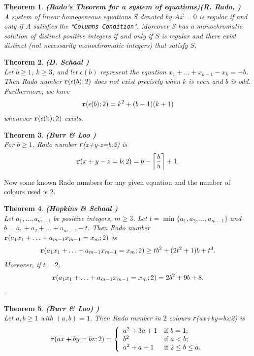 \documentclass[12pt]{report}
\def\ora{\overrightarrow}
\newtheorem{thm}{Theorem}[chapter]
\begin{document}
\begin{thm}{\bf (Rado's Theorem for a system of equations)}{\bf (R. Rado, \cite{Rado1,Rado2,Rado3})} \\[5pt]
A system of linear homogeneous equations $S$ denoted by $A \ora{x}=0$ is regular if and only if $A$ satisfies the ``{\tt \/Columns Condition}". Moreover $S$ has a monochromatic solution of distinct positive integers if and only if $S$ is regular and there exist distinct (not necessarily monochromatic integers) that satisfy $S$.
\end{thm}

\begin{thm}{\bf  (D. Schaal \cite{DS})} \\[5pt]
Let $b \geq 1$, $k \geq 3$, and let $\epsilon(b)$ represent the equation $x_1+\ldots+x_{k-1}-x_k=-b$. Then Rado number ${\tt{r}}(\epsilon(b);2)$ does not exist precisely when $k$ is even and $b$ is odd. Furthermore, we have
\[{\tt{r}}(\epsilon(b);2) = k^2+(b-1)(k+1) \]
whenever $\tt{r}(\epsilon(b);2)$ exists.
\end{thm}

\begin{thm}{\bf (Burr \& Loo {\cite{BL}})} \\[5pt]
For $b \geq 1$, Rado number {\tt{r}}(x+y-z=b;2) is 
\[ {\tt{r}}(x+y-z=b;2) = b - \left\lceil \frac{b}{5} \right\rceil + 1. \]
\end{thm}

\noindent Now some known Rado numbers for any given equation and the number of colours used is $2$. 

\begin{thm}{\bf (Hopkins \& Schaal {\cite{HS}})} \\[5pt]
Let $a_1,\ldots,a_{m-1}$ be positive integers, $m \ge 3$. Let $t=\min\{a_1,a_2,\ldots,a_{m-1}\}$ and $b=a_1+a_2+\ldots+a_{m-1}-t$. Then Rado number ${\tt{r}}(a_1x_1+\ldots+a_{m-1}x_{m-1}=x_m;2)$ is
\[ {\tt{r}}(a_1x_1+\ldots+a_{m-1}x_{m-1}=x_m;2) \geq tb^2+(2t^2+1)b+t^3. \]
Moreover, if $t=2$, 
\[ {\tt{r}}(a_1x_1+\ldots+a_{m-1}x_{m-1}=x_m;2) = 2b^2+9b+8. \].
\end{thm}

\begin{thm}{\bf (Burr \& Loo) {\cite{BL}})} \\[5pt]
Let $a,b \geq 1$ with $(a,b)=1$. Then Rado number in $2$ colours {\tt{r}}(ax+by=bz;2) is
\[ {\tt{r}}(ax+by=bz;2) = \left\{ \begin{array}{ll}
                            a^2+3a+1 & \mbox{if $b=1$};\\
                            b^2 & \mbox{if $a<b$};\\
                            a^2+a+1 & \mbox{if $2 \leq b \leq a$}. 
                                        \end{array}
                           \right.
\]
\end{thm}
\end{document}
